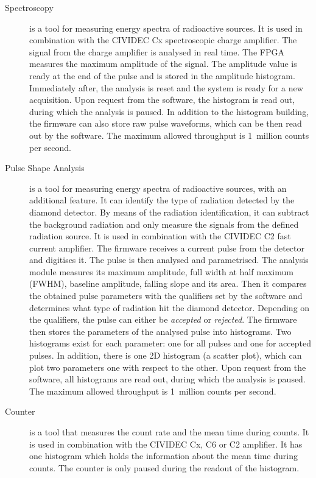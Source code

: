\documentclass[12pt]{packages/mytustyle}  %
\begin{document}
\begin{description}
\item[Spectroscopy] is a tool for measuring energy spectra of radioactive sources. It is used in combination with the CIVIDEC Cx spectroscopic charge amplifier. The signal from the charge amplifier is analysed in real time. The FPGA measures the maximum amplitude of the signal. The amplitude value is ready at the end of the pulse and is stored in the amplitude histogram. Immediately after, the analysis is reset and the system is ready for a new acquisition. Upon request from the software, the histogram is read out, during which the analysis is paused. In addition to the histogram building, the firmware can also store raw pulse waveforms, which can be then read out by the software. The maximum allowed throughput is 1~million counts per second.

\item[Pulse Shape Analysis] is a tool for measuring energy spectra of radioactive sources, with an additional feature. It can identify the type of radiation detected by the diamond detector. By means of the radiation identification, it can subtract the background radiation and only measure the signals from the defined radiation source. It is used in combination with the CIVIDEC C2 fast current amplifier. The firmware receives a current pulse from the detector and digitises it. The pulse is then analysed and parametrised. The analysis module measures its maximum amplitude, full width at half maximum (FWHM), baseline amplitude, falling slope and its area. Then it compares the obtained pulse parameters with the qualifiers set by the software and determines what type of radiation hit the diamond detector. Depending on the qualifiers, the pulse can either be \emph{accepted} or \emph{rejected}. The firmware then stores the parameters of the analysed pulse into histograms. Two histograms exist for each parameter: one for all pulses and one for accepted pulses. In addition, there is one 2D histogram (a scatter plot), which can plot two parameters one with respect to the other. Upon request from the software, all histograms are read out, during which the analysis is paused. The maximum allowed throughput is 1~million counts per second.

\item[Counter] is a tool that measures the count rate and the mean time during counts. It is used in combination with the CIVIDEC Cx, C6 or C2 amplifier. It has one histogram which holds the information about the mean time during counts. The counter is only paused during the readout of the histogram.
 
\end{description}
\end{document}
